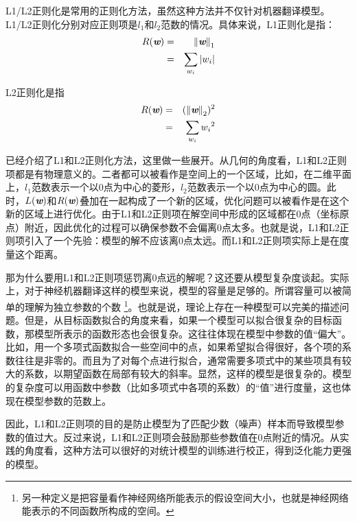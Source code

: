 \parinterval L1/L2正则化是常用的正则化方法，虽然这种方法并不仅针对机器翻译模型。L1/L2正则化分别对应正则项是$l_1$和$l_2$范数的情况。具体来说，L1正则化是指：
\begin{eqnarray}
R(\textbf{\em w}) & = & {\Vert{\textbf{\em w}}\Vert}_1 \\
			     & =  &\sum_{w_i}|w_i| \nonumber
\label{eq:13-3}
\end{eqnarray}

\parinterval L2正则化是指
\begin{eqnarray}
R(\textbf{\em w}) & = & ({\Vert{\textbf{\em w}}\Vert}_2)^2 \\
			     & =  &\sum_{w_i}{w_i}^2 \nonumber
\label{eq:13-4}
\end{eqnarray}

\parinterval {\chapternine}已经介绍了L1和L2正则化方法，这里做一些展开。从几何的角度看，L1和L2正则项都是有物理意义的。二者都可以被看作是空间上的一个区域，比如，在二维平面上，$l_1$范数表示一个以0点为中心的菱形，$l_2$范数表示一个以0点为中心的圆。此时，$L(\textbf{\em w})$和$R(\textbf{\em w})$叠加在一起构成了一个新的区域，优化问题可以被看作是在这个新的区域上进行优化。由于L1和L2正则项在解空间中形成的区域都在0点（坐标原点）附近，因此优化的过程可以确保参数不会偏离0点太多。也就是说，L1和L2正则项引入了一个先验：模型的解不应该离0点太远。而L1和L2正则项实际上是在度量这个距离。

\parinterval 那为什么要用L1和L2正则项惩罚离0点远的解呢？这还要从模型复杂度谈起。实际上，对于神经机器翻译这样的模型来说，模型的容量是足够的。所谓容量可以被简单的理解为独立参数的个数 \footnote{另一种定义是把容量看作神经网络所能表示的假设空间大小，也就是神经网络能表示的不同函数所构成的空间。}。也就是说，理论上存在一种模型可以完美的描述问题。但是，从目标函数拟合的角度来看，如果一个模型可以拟合很复杂的目标函数，那模型所表示的函数形态也会很复杂。这往往体现在模型中参数的值“偏大”。比如，用一个多项式函数拟合一些空间中的点，如果希望拟合得很好，各个项的系数往往是非零的。而且为了对每个点进行拟合，通常需要多项式中的某些项具有较大的系数，以期望函数在局部有较大的斜率。显然，这样的模型是很复杂的。模型的复杂度可以用函数中参数（比如多项式中各项的系数）的“值”进行度量，这也体现在模型参数的范数上。

\parinterval 因此，L1和L2正则项的目的是防止模型为了匹配少数（噪声）样本而导致模型参数的值过大。反过来说，L1和L2正则项会鼓励那些参数值在0点附近的情况。从实践的角度看，这种方法可以很好的对统计模型的训练进行校正，得到泛化能力更强的模型。


